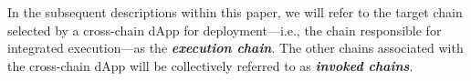 In the subsequent descriptions within this paper, we will refer to the target chain selected by a cross-chain dApp for deployment—i.e., the chain responsible for integrated execution—as the \textbf{\emph{execution chain}}. 
The other chains associated with the cross-chain dApp will be collectively referred to as \textbf{\emph{invoked chains}}.